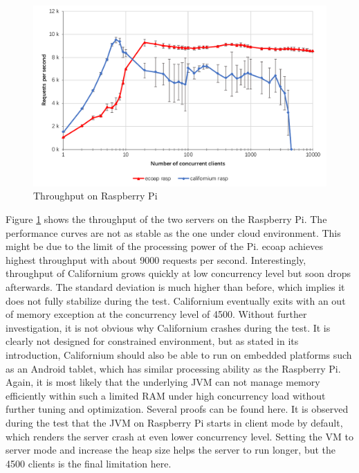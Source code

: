 \begin{figure}[!htbp]
\centering
\includegraphics[scale = 0.8]{throughput_rasp}
\caption{Throughput on Raspberry Pi}
\label{fig:throughput_rasp}
\end{figure}

Figure \ref{fig:throughput_rasp} shows the throughput of the two servers on the Raspberry Pi. The performance curves are not as stable as the one under cloud environment. This might be due to the limit of the processing power of the Pi. ecoap achieves highest throughput with about 9000 requests per second. Interestingly, throughput of Californium grows quickly at low concurrency level but soon drops afterwards. The standard deviation is much higher than before, which implies it does not fully stabilize during the test. Californium eventually exits with an out of memory exception at the concurrency level of 4500. Without further investigation, it is not obvious why Californium crashes during the test. It is clearly not designed for constrained environment, but as stated in its introduction, Californium should also be able to run on embedded platforms such as an Android tablet, which has similar processing ability as the Raspberry Pi. Again, it is most likely that the underlying JVM can not manage memory efficiently within such a limited RAM under high concurrency load without further tuning and optimization. Several proofs can be found here. It is observed during the test that the JVM on Raspberry Pi starts in client mode by default, which renders the server crash at even lower concurrency level. Setting the VM to server mode and increase the heap size helps the server to run longer, but the 4500 clients is the final limitation here. 

